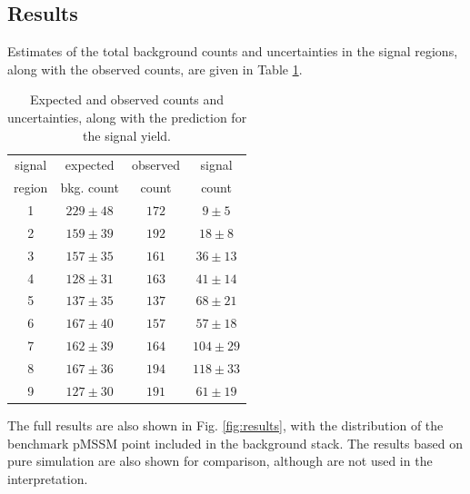 \subsection{Results}
Estimates of the total background counts and uncertainties in the signal regions, along with the observed counts, are given in Table \ref{tab:results}.  
 \begin{table}[htb]
    \label{tab:preCMS}
        \caption{Expected and observed counts and uncertainties, along with the prediction for the signal yield.}
    \centering
    \vspace{1ex}
    \begin{tabular}{c|c|c|c}
    \hline
    signal & expected    & observed  & signal  \\
    region & bkg. count    & count   & count  \\
    \hline\hline
1 & $229\pm48$ & $172$ & $9\pm5$\\
2 & $159\pm39$ & $192$ & $18\pm8$\\
3 & $157\pm35$ & $161$ & $36\pm13$\\
4 & $128\pm31$ & $163$ & $41\pm14$\\
5 & $137\pm35$ & $137$ & $68\pm21$\\
6 & $167\pm40$ & $157$ & $57\pm18$\\
7 & $162\pm39$ & $164$ & $104\pm29$\\
8 & $167\pm36$ & $194$ & $118\pm33$\\
9 & $127\pm30$ & $191$ & $61\pm19$\\
\hline
    \end{tabular}
    \label{tab:results}
    \end{table}
The full results are also shown in Fig. \ref{fig:results}, with the distribution of the benchmark pMSSM point included in the background stack. The results based on pure simulation are also shown for comparison, although are not used in the interpretation. 
